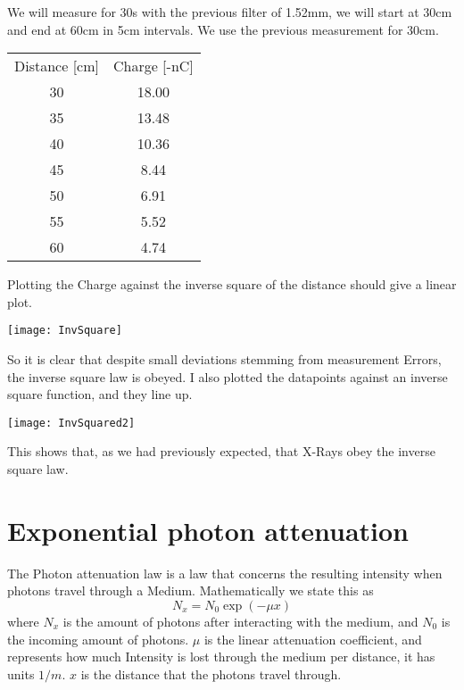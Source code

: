 \documentclass[]{scrartcl}
\begin{document}
We will measure for 30s with the previous filter of 1.52mm, we will start at 30cm and end at 60cm in 5cm intervals. We use the previous measurement for 30cm.

\begin{center}
	\begin{tabular}{||c|c||}
		\hline
		Distance [cm] & Charge [-nC] \\
		30 & 18.00\\
		35 & 13.48\\
		40 & 10.36\\
		45 & 8.44\\
		50 & 6.91\\
		55 & 5.52\\
		60 & 4.74\\
		\hline
	\end{tabular}
\end{center}

Plotting the Charge against the inverse square of the distance should give a linear plot.

\begin{centering}
	\texttt{[image: InvSquare]}
\end{centering}
So it is clear that despite small deviations stemming from measurement Errors, the inverse square law is obeyed. I also plotted the datapoints against an inverse square function, and they line up.
\begin{centering}
	\texttt{[image: InvSquared2]}
\end{centering}

This shows that, as we had previously expected, that X-Rays obey the inverse square law.




\section{Exponential photon attenuation}
The Photon attenuation law is a law that concerns the resulting intensity when photons travel through a Medium. Mathematically we state this as
\begin{equation}
	N_x = N_0 \exp(-\mu x)
\end{equation}
where $N_x$ is the amount of photons after interacting with the medium, and $N_0$ is the incoming amount of photons. $\mu$ is the linear attenuation coefficient, and represents how much Intensity is lost through the medium per distance, it has units $1/m$. $x$ is the distance that the photons travel through.
\end{document}
